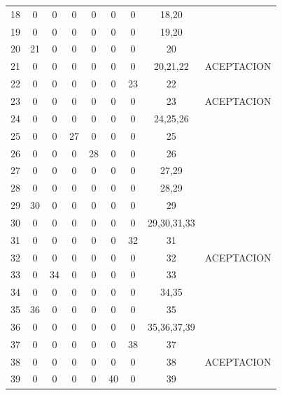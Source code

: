 \begin{longtable}{||c||ccccccc||c||}
18  & 0   & 0  & 0  & 0   & 0   & 0   & 18,20                   &             \\
19  & 0   & 0  & 0  & 0   & 0   & 0   & 19,20                   &             \\
20  & 21  & 0  & 0  & 0   & 0   & 0   & 20                      &             \\
21  & 0   & 0  & 0  & 0   & 0   & 0   & 20,21,22                & ACEPTACION  \\
22  & 0   & 0  & 0  & 0   & 0   & 23  & 22                      &             \\
23  & 0   & 0  & 0  & 0   & 0   & 0   & 23                      & ACEPTACION  \\
24  & 0   & 0  & 0  & 0   & 0   & 0   & 24,25,26                &             \\
25  & 0   & 0  & 27 & 0   & 0   & 0   & 25                      &             \\
26  & 0   & 0  & 0  & 28  & 0   & 0   & 26                      &             \\
27  & 0   & 0  & 0  & 0   & 0   & 0   & 27,29                   &             \\
28  & 0   & 0  & 0  & 0   & 0   & 0   & 28,29                   &             \\
29  & 30  & 0  & 0  & 0   & 0   & 0   & 29                      &             \\
30  & 0   & 0  & 0  & 0   & 0   & 0   & 29,30,31,33             &             \\
31  & 0   & 0  & 0  & 0   & 0   & 32  & 31                      &             \\
32  & 0   & 0  & 0  & 0   & 0   & 0   & 32                      & ACEPTACION  \\
33  & 0   & 34 & 0  & 0   & 0   & 0   & 33                      &             \\
34  & 0   & 0  & 0  & 0   & 0   & 0   & 34,35                   &             \\
35  & 36  & 0  & 0  & 0   & 0   & 0   & 35                      &             \\
36  & 0   & 0  & 0  & 0   & 0   & 0   & 35,36,37,39             &             \\
37  & 0   & 0  & 0  & 0   & 0   & 38  & 37                      &             \\
38  & 0   & 0  & 0  & 0   & 0   & 0   & 38                      & ACEPTACION  \\
39  & 0   & 0  & 0  & 0   & 40  & 0   & 39                      &             \\

\end{longtable}
